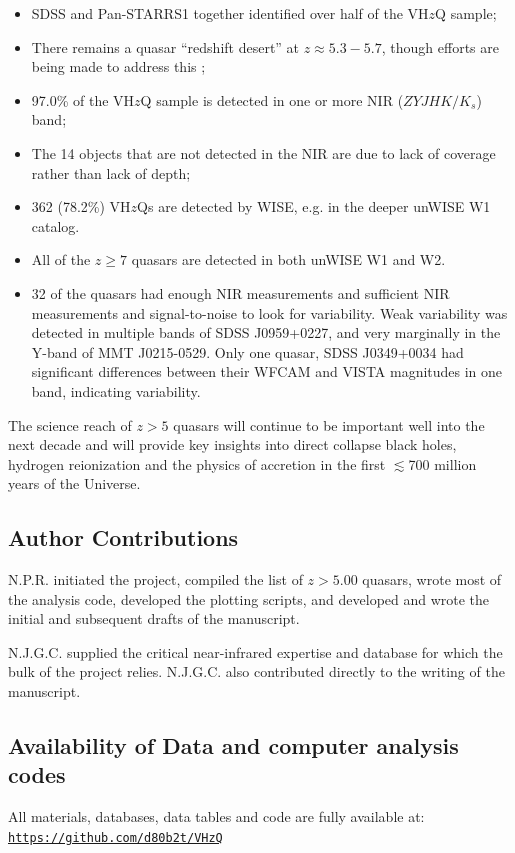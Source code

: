 \documentclass[usenatbib]{mnras}
\begin{document}
\begin{itemize}
  \item SDSS and Pan-STARRS1 together identified over half of the VH$z$Q sample;
  \item There remains a quasar ``redshift desert'' at $z\approx5.3-5.7$, though efforts are being made to address this
    \citep[e.g.,][]{YangJ2018a};
  \item 97.0\% of the VH$z$Q sample is detected in one or more NIR
    ($ZYJHK/K_{s}$) band;
  \item The 14 objects that are not detected in the NIR are due to
    lack of coverage rather than lack of depth;
  \item 362 (78.2\%) VH$z$Qs are detected by WISE, e.g. in the deeper
    unWISE W1 catalog.
  \item All of the $z\geq7$ quasars are detected in both unWISE W1 and
    W2.
  \item 32 of the quasars had enough NIR measurements and sufficient
    NIR measurements and signal-to-noise to look for variability. Weak
    variability was detected in multiple bands of SDSS J0959+0227, and
    very marginally in the Y-band of MMT J0215-0529. Only one quasar, SDSS
    J0349+0034 had significant differences between their WFCAM and VISTA
    magnitudes in one band, indicating variability.
 \end{itemize}

The science reach of $z>5$ quasars will continue to be important well
into the next decade \citep{Becker2019_DecadalWP, Fan2019_DecadalWP,
Wang2019_DecadalWP} and will provide key insights into direct collapse
black holes, hydrogen reionization and the physics of accretion in the
first $\lesssim$700 million years of the Universe.



\subsection*{Author Contributions}   
N.P.R. initiated the project, compiled the list of $z>5.00$ quasars,
wrote most of the analysis code, developed the plotting scripts, and
developed and wrote the initial and subsequent drafts of the
manuscript.

N.J.G.C. supplied the critical near-infrared expertise and database
for which the bulk of the project relies. N.J.G.C. also contributed
directly to the writing of the manuscript.



\subsection*{Availability of Data and computer analysis codes} 
All materials, databases, data tables and code are fully available at: 
\href{https://github.com/d80b2t/VHzQ}{\tt https://github.com/d80b2t/VHzQ}
\end{document}
